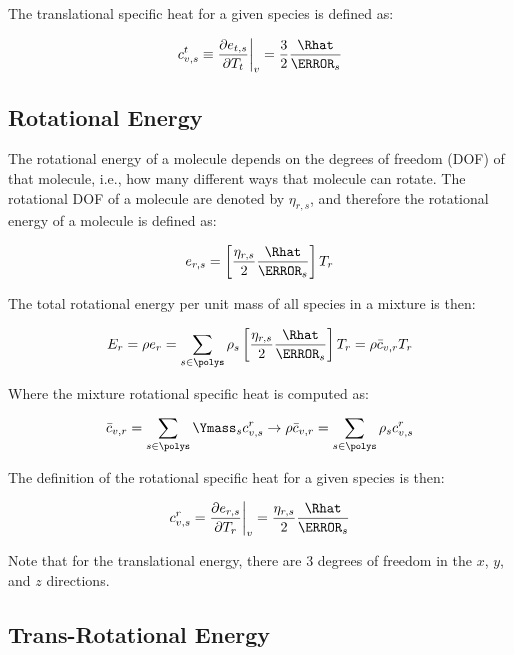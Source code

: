\documentclass[10pt]{article}
\begin{document}
\begin{flushleft}
The translational specific heat for a given species is defined as:

\begin{equation}
    c_{v,s}^{t} \equiv \pd{e_{t,s}}{T_t}\bigg|_v = \frac{3}{2} \frac{\Rhat}{\MW_s}
\end{equation}

\subsection{Rotational Energy}

The rotational energy of a molecule depends on the degrees of freedom (DOF) of that molecule, i.e., how many different ways that molecule can rotate. The rotational DOF of a molecule are denoted by $\eta_{r,s}$, and therefore the rotational energy of a molecule is defined as:

\begin{equation*}
    e_{r,s} = \bb{\frac{\eta_{r,s}}{2} \frac{\Rhat}{\MW_s}} T_r
\end{equation*}

The total rotational energy per unit mass of all species in a mixture is then:

\begin{equation*}
    E_r = \rho e_r = \sum_{s \in \polys} \rho_s \bb{\frac{\eta_{r,s}}{2} \frac{\Rhat}{\MW_s}} T_r = \rho \bar{c}_{v,r} T_r
\end{equation*}

Where the mixture rotational specific heat is computed as:

\begin{equation*}
    \bar{c}_{v,r} = \sum_{s \in \polys} \Ymass_s c_{v,s}^{r} \rightarrow \rho \bar{c}_{v,r} = \sum_{s \in \polys} \rho_s c_{v,s}^{r}
\end{equation*}

The definition of the rotational specific heat for a given species is then:

\begin{equation*}
    c_{v,s}^r = \pd{e_{r,s}}{T_r}\bigg|_v = \frac{\eta_{r,s}}{2} \frac{\Rhat}{\MW_s}
\end{equation*}

Note that for the translational energy, there are 3 degrees of freedom in the $x$, $y$, and $z$ directions. 

\subsection{Trans-Rotational Energy}


\end{flushleft}
\end{document}
